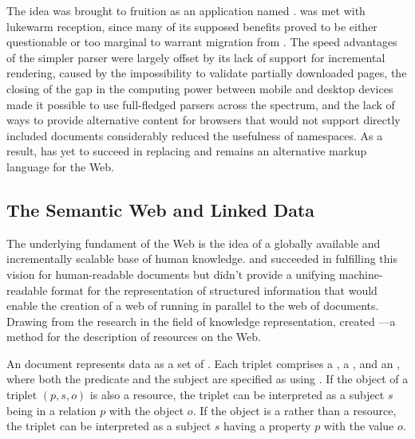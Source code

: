 The idea was brought to fruition as an  application named
.  was met with lukewarm reception, since many of
its supposed benefits proved to be either questionable or too marginal to
warrant migration from . The speed advantages of the simpler
parser were largely offset by its lack of support for incremental rendering,
caused by the impossibility to validate partially downloaded pages, the closing
of the gap in the computing power between mobile and desktop devices made it
possible to use full-fledged  parsers across the spectrum, and the
lack of ways to provide alternative content for browsers that would not support
directly included  documents considerably reduced the usefulness
of  namespaces. As a result,  has yet to succeed in
replacing  and remains an alternative markup language for the Web.


\subsection{The Semantic Web and Linked Data}
The underlying fundament of the Web is the idea of a globally available and
incrementally scalable base of human knowledge.  and
 succeeded in fulfilling this vision for human-readable documents
but didn't provide a unifying machine-readable format for the representation of
structured information that would enable the creation of a web of 
running in parallel to the web of documents. Drawing from the research in the
field of knowledge representation,  created ---a
method for the description of resources on the Web.

An  document represents data as a set of %
. Each triplet comprises a
, a %
, and an ,
where both the predicate and the subject are specified as 
 using . If the object of a triplet
$(p,s,o)$ is also a resource, the triplet can be interpreted as a subject $s$
being in a relation $p$ with the object $o$. If the object is a   rather than a resource, the triplet can be
interpreted as a subject $s$ having a property $p$ with the value $o$.

